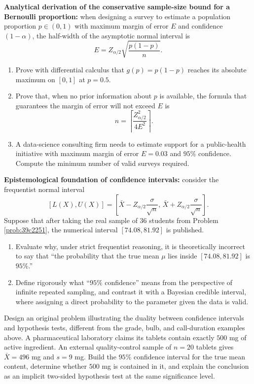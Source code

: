\begin{problema}\label{prob:0257f5f}
\textbf{Analytical derivation of the conservative sample-size bound for a Bernoulli proportion:} when designing a survey to estimate a population proportion $p\in(0,1)$ with maximum margin of error $E$ and confidence $(1-\alpha)$, the half-width of the asymptotic normal interval is
\[
	E=Z_{\alpha/2}\sqrt{\frac{p(1-p)}{n}}.
\]
\begin{enumerate}[label=(\alph*)]
	\item Prove with differential calculus that $g(p)=p(1-p)$ reaches its absolute maximum on $[0,1]$ at $p=0.5$.
	\item Prove that, when no prior information about $p$ is available, the formula that guarantees the margin of error will not exceed $E$ is
	\[
		n=\left\lceil\frac{Z_{\alpha/2}^2}{4E^2}\right\rceil.
	\]
	\item A data-science consulting firm needs to estimate support for a public-health initiative with maximum margin of error $E=0.03$ and $95\%$ confidence. Compute the minimum number of valid surveys required.
\end{enumerate}
\end{problema}

\begin{problema}\label{prob:a3ef454}
\textbf{Epistemological foundation of confidence intervals:} consider the frequentist normal interval
\[
	[L(X),U(X)]=\left[\bar X-Z_{\alpha/2}\frac{\sigma}{\sqrt n},\,
	\bar X+Z_{\alpha/2}\frac{\sigma}{\sqrt n}\right].
\]
Suppose that after taking the real sample of $36$ students from Problem \ref{prob:39c2251}, the numerical interval $[74.08,81.92]$ is published.
\begin{enumerate}[label=(\alph*)]
	\item Evaluate why, under strict frequentist reasoning, it is theoretically incorrect to say that ``the probability that the true mean $\mu$ lies inside $[74.08,81.92]$ is $95\%$.''
	\item Define rigorously what ``$95\%$ confidence'' means from the perspective of infinite repeated sampling, and contrast it with a Bayesian credible interval, where assigning a direct probability to the parameter given the data is valid.
\end{enumerate}
\end{problema}

\begin{problema}\label{prob:18d6b96}
Design an original problem illustrating the duality between confidence intervals and hypothesis tests, different from the grade, bulb, and call-duration examples above. A pharmaceutical laboratory claims its tablets contain exactly $500$ mg of active ingredient. An external quality-control sample of $n=20$ tablets gives $\bar X=496$ mg and $s=9$ mg. Build the $95\%$ confidence interval for the true mean content, determine whether $500$ mg is contained in it, and explain the conclusion as an implicit two-sided hypothesis test at the same significance level.
\end{problema}

